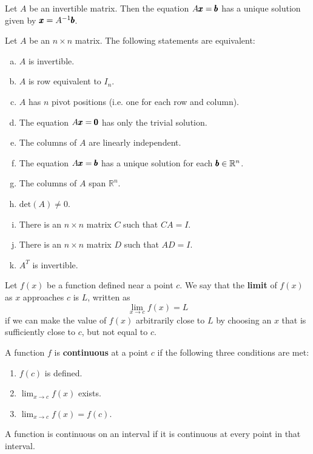 \begin{theorem}
    Let \( A \) be an invertible matrix. Then the equation \( A \pmb{x} = \pmb{b} \) has a unique solution given by \( \pmb{x} = A^{-1} \pmb{b} \).
\end{theorem}

\begin{theorem}
    Let \( A \) be an \( n \times n \) matrix. The following statements are equivalent:
    \begin{enumerate}[(a)]
        \item $A$ is invertible.
        \item $A$ is row equivalent to $I_n$.
        \item $A$ has $n$ pivot positions (i.e. one for each row and column).
        \item The equation $A \pmb{x}=\pmb{0}$ has only the trivial solution.
        \item The columns of $A$ are linearly independent.
        \item The equation \( A \pmb{x} = \pmb{b} \) has a unique solution for each \( \pmb{b} \in \mathbb{R}^n \).
        \item The columns of $A$ span $\mathbb{R}^n$.
        \item \( \text{det}(A) \neq 0 \).
        \item There is an $n \times n$ matrix $C$ such that $C A=I$.
        \item There is an $n \times n$ matrix $D$ such that $A D=I$.
        \item $A^T$ is invertible.
    \end{enumerate}
\end{theorem}



\begin{definition}[Limit]
Let \( f(x) \) be a function defined near a point \( c \). We say that the \textbf{limit} of \( f(x) \) as \( x \) approaches \( c \) is \( L \), written as
\vspace{0.5em}
\[
\lim_{x \to c} f(x) = L
\]
\vspace{0.5em}
if we can make the value of \( f(x) \) arbitrarily close to \( L \) by choosing an \( x \) that is sufficiently close to \( c \), but not equal to \( c \).
\end{definition}

\begin{definition}[Continuity]
A function \( f \) is \textbf{continuous} at a point \( c \) if the following three conditions are met:
\begin{enumerate}
    \item \( f(c) \) is defined.
    \item \( \lim_{x \to c} f(x) \) exists.
    \item \( \lim_{x \to c} f(x) = f(c) \).
\end{enumerate}
A function is continuous on an interval if it is continuous at every point in that interval.
\end{definition}

